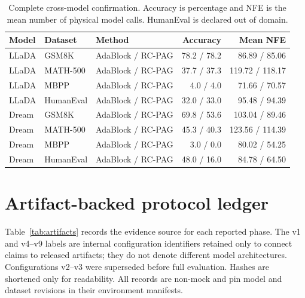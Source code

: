 \documentclass{article}
\newcommand{\rcpag}{RC-PAG}
\newcommand{\nfe}{NFE}
\begin{document}
\begin{table}[h]
  \caption{Complete cross-model confirmation. Accuracy is percentage and \nfe{} is the mean number of physical model calls. HumanEval is declared out of domain.}
  \label{tab:complete-results}
  \centering
  \small
  \begin{tabular}{lllrr}
    \toprule
    Model & Dataset & Method & Accuracy & Mean \nfe{} \\
    \midrule
    LLaDA & GSM8K & AdaBlock / \rcpag{} & 78.2 / 78.2 & 86.89 / 85.06 \\
    LLaDA & MATH-500 & AdaBlock / \rcpag{} & 37.7 / 37.3 & 119.72 / 118.17 \\
    LLaDA & MBPP & AdaBlock / \rcpag{} & 4.0 / 4.0 & 71.66 / 70.57 \\
    LLaDA & HumanEval & AdaBlock / \rcpag{} & 32.0 / 33.0 & 95.48 / 94.39 \\
    \midrule
    Dream & GSM8K & AdaBlock / \rcpag{} & 69.8 / 53.6 & 103.04 / 89.46 \\
    Dream & MATH-500 & AdaBlock / \rcpag{} & 45.3 / 40.3 & 123.56 / 114.39 \\
    Dream & MBPP & AdaBlock / \rcpag{} & 3.0 / 0.0 & 80.02 / 54.25 \\
    Dream & HumanEval & AdaBlock / \rcpag{} & 48.0 / 16.0 & 84.78 / 64.50 \\
    \bottomrule
  \end{tabular}
\end{table}

\section{Artifact-backed protocol ledger}
\label{app:artifacts}

Table~\ref{tab:artifacts} records the evidence source for each reported phase. The v1 and v4--v9 labels are internal configuration identifiers retained only to connect claims to released artifacts; they do not denote different model architectures. Configurations v2--v3 were superseded before full evaluation. Hashes are shortened only for readability. All records are non-mock and pin model and dataset revisions in their environment manifests.
\end{document}
